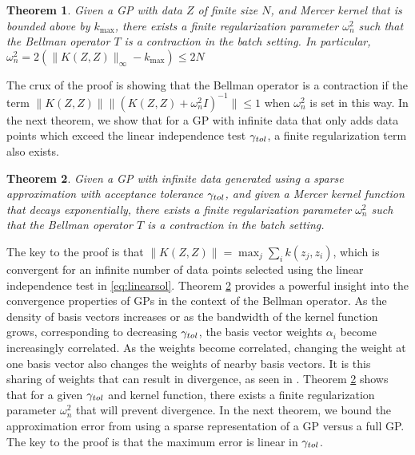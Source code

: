 \documentclass[letterpaper,12pt,peerreviewca,draftcls]{IEEEtran}
\newtheorem{theorem}{Theorem}%
\begin{document}
\begin{theorem}
\label{th:finite}
Given a GP with data $Z$ of finite size $N$, and Mercer kernel that is bounded above by $k_{\max}$, there exists a finite regularization parameter $\omega_n^2$ such that the Bellman operator $T$ is a contraction in the batch setting. In particular, $\omega_n^2 = 2(\|K(Z,Z)\|_\infty -k_{\max}) \leq 2N$
\end{theorem}
The crux of the proof is showing that the Bellman operator is a contraction if the term $\|K(Z,Z)\| \| (K(Z,Z) + \omega_n^2I)^{-1}\| \leq 1$ when  $\omega_n^2$ is set in this way. 
In the next theorem, we show that for a GP with infinite data that only adds data points which exceed the linear independence test $\gamma_{tol}$, a finite regularization term also exists.
\begin{theorem}
\label{th:batch}
Given a GP with infinite data generated using a sparse approximation with acceptance tolerance $\gamma_{tol}$, and given a Mercer kernel function that decays exponentially, there exists a finite regularization parameter $\omega_n^2$ such that the Bellman operator $T$ is a contraction in the batch setting.
\end{theorem}
The key to the proof is that $\|K(Z,Z)\| = \max_j \sum_i k(z_j,z_i)$, which is convergent for an infinite number of data points selected using the linear independence test in \eqref{eq:linearsol}.
Theorem \ref{th:batch} provides a powerful insight into the convergence properties of GPs in the context of the Bellman operator.
As the density of basis vectors increases or as the bandwidth of the kernel function grows, corresponding to decreasing $\gamma_{tol}$, the basis vector weights $\alpha_i$ become increasingly correlated. As the weights become correlated, changing the weight at one basis vector also changes the weights of nearby basis vectors. It is this sharing of weights that can result in divergence, as seen in \cite{Baird95}. Theorem \ref{th:batch} shows that for a given $\gamma_{tol}$ and kernel function, there exists a finite regularization parameter $\omega_n^2$ that will prevent divergence. In the next theorem, we bound the approximation error from using a sparse representation of a GP versus a full GP.
The key to the proof is that the maximum error is linear in $\gamma_{tol}$.
\end{document}
